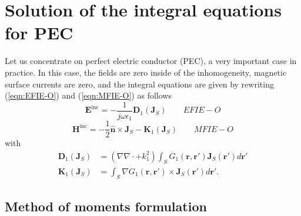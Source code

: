 \documentclass[a4paper,10pt]{book}
\newcommand{\field}[1]{\mathbf{#1}}
\newcommand{\current}[1]{\mathbf{#1}}
\newcommand{\vect}[1]{\mathbf{#1}}
\newcommand{\operator}[1]{\mathbf{#1}}
\renewcommand{\arg}[1]{\ensuremath{\!\left(#1\right)}}
\begin{document}
\chapter{Solution of the integral equations for PEC}
%
\par
Let us concentrate on perfect electric conductor (PEC), a very important case in practice. In this case, the fields are zero inside of the inhomogeneity, magnetic surface currents are zero, and the integral equations are given by rewriting (\ref{eqn:EFIE-O}) and (\ref{eqn:MFIE-O}) as follows
\begin{equation}\label{eqn:EFIE-O_PEC}
\boxed{
\field{E}^\text{inc} =  - \frac{1}{j \omega \epsilon_1} \operator{D}_1 \left( \current{J}_{S}\right) 
} \qquad EFIE-O
\end{equation}
\begin{equation}\label{eqn:MFIE-O_PEC}
\boxed{
\field{H}^\text{inc} = - \frac{1}{2} \vect{\hat{n}} \times \current{J}_{S} - \operator{K}_1 \left(\current{J}_{S}\right)
} \qquad MFIE-O
\end{equation}
with
\begin{align*}
\operator{D}_1\arg{\current{J}_S} &= \left(\nabla \nabla \cdot + k_1^2\right) \int_{S} G_1\left(\vect{r}, \vect{r}'\right) \current{J}_S\left(\vect{r}'\right) d\vect{r}' \\
\operator{K}_1\left(\current{J}_S\right) &= \int_S \nabla G_1\left(\vect{r}, \vect{r}'\right) \times \current{J}_S\left(\vect{r}'\right) d\vect{r}'.
\end{align*}


\section{Method of moments formulation}
\end{document}
